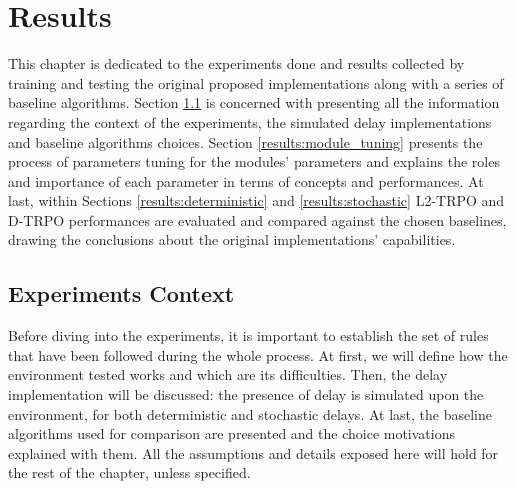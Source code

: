 \chapter{Results}
\label{chp:results}
    This chapter is dedicated to the experiments done and results collected by training and testing the original proposed implementations along with a series of baseline algorithms. Section \ref{results:context} is concerned with presenting all the information regarding the context of the experiments, the simulated delay implementations and baseline algorithms choices. Section \ref{results:module_tuning} presents the process of parameters tuning for the modules' parameters and explains the roles and importance of each parameter in terms of concepts and performances. At last, within Sections \ref{results:deterministic} and \ref{results:stochastic} L2-TRPO and D-TRPO performances are evaluated and compared against the chosen baselines, drawing the conclusions about the original implementations' capabilities.
    
    \section{Experiments Context}
    \label{results:context}
        Before diving into the experiments, it is important to establish the set of rules that have been followed during the whole process. At first, we will define how the environment tested works and which are its difficulties. Then, the delay implementation will be discussed: the presence of delay is simulated upon the environment, for both deterministic and stochastic delays. At last, the baseline algorithms used for comparison are presented and the choice motivations explained with them. All the assumptions and details exposed here will hold for the rest of the chapter, unless specified.
        
